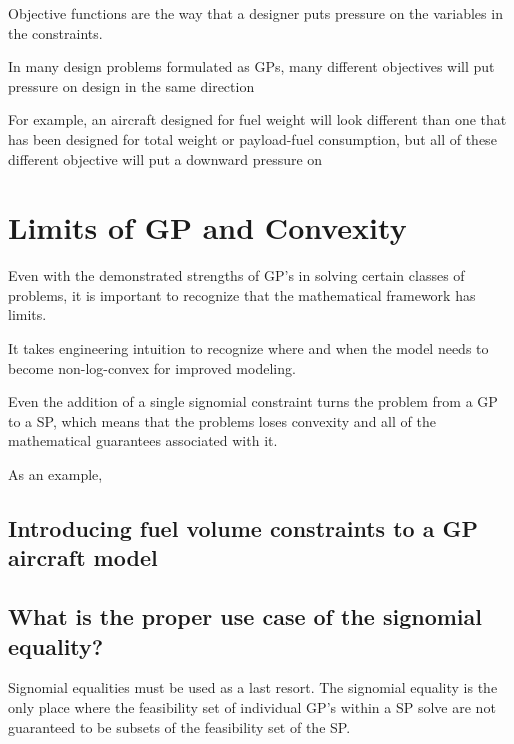 Objective functions are the way that a designer puts pressure on the variables 
in the constraints. 

In many design problems
formulated as \gls{GP}s, many different objectives will put pressure on design 
in the same direction

For example, an aircraft designed for fuel weight will look different than one 
that has been designed for total weight or payload-fuel consumption, but all of
these different objective will put a downward pressure on

\section{Limits of GP and Convexity} \label{sec:GPLimits}

Even with the demonstrated strengths of \gls{GP}'s in solving certain classes of problems, it is important to recognize that the mathematical framework has limits. 

It takes engineering intuition to recognize where and when the model needs to become non-log-convex for improved modeling. 

Even the addition of a single signomial constraint turns the problem from a \gls{GP} to a \gls{SP}, which means that the problems loses convexity and all of the mathematical guarantees associated with it. 

As an example, 

\subsection{Introducing fuel volume constraints to a GP aircraft model}

\subsection{What is the proper use case of the signomial equality?} 

Signomial equalities must be used as a last resort. The signomial equality is the only place where the feasibility set of individual \gls{GP}'s within a \gls{SP} solve are not guaranteed to be subsets of the feasibility set of the \gls{SP}. 